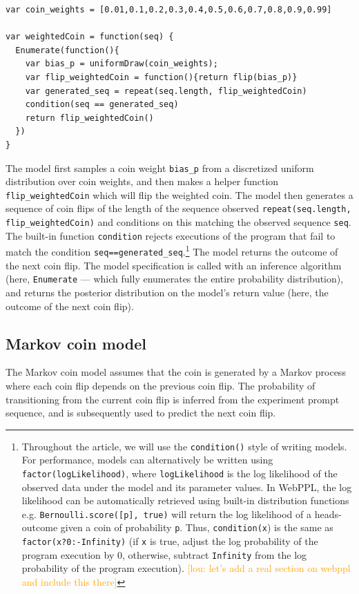 \documentclass{article}
\newcommand{\lou}[1]{\textcolor{orange}{[lou: #1]}}
\begin{document}
\begin{lstlisting}[caption=Biased coin model,  label={lst:m_weighted}]
var coin_weights = [0.01,0.1,0.2,0.3,0.4,0.5,0.6,0.7,0.8,0.9,0.99]

var weightedCoin = function(seq) {
  Enumerate(function(){
    var bias_p = uniformDraw(coin_weights);
    var flip_weightedCoin = function(){return flip(bias_p)}
    var generated_seq = repeat(seq.length, flip_weightedCoin)
    condition(seq == generated_seq)
    return flip_weightedCoin()
  })
}
\end{lstlisting}

%
The model first samples a coin weight \lstinline{bias_p} from a discretized uniform distribution over coin weights, and
then makes a helper function \lstinline{flip_weightedCoin} which will flip the weighted coin.
The model then generates a sequence of coin flips of the length of the sequence observed \lstinline{repeat(seq.length, flip_weightedCoin)} and conditions on this matching the observed sequence \lstinline{seq}.
The built-in function \lstinline{condition} rejects executions of the program that fail to match the condition \lstinline{seq==generated_seq}.\footnote{
Throughout the article, we will use the \lstinline{condition()} style of writing models. For performance, models can alternatively be written using \lstinline{factor(logLikelihood)}, where \lstinline{logLikelihood} is the log likelihood of the observed data under the model and its parameter values. In WebPPL, the log likelihood can be automatically retrieved using built-in distribution functions e.g. \lstinline{Bernoulli.score([p], true)} will return the log likelihood of a heads-outcome given a coin of probability \lstinline{p}.
Thus, \lstinline{condition(x}) is the same as \lstinline{factor(x?0:-Infinity)} (if \lstinline{x} is true, adjust the log probability of the program execution by 0, otherwise, subtract \lstinline{Infinity} from the log probability of the program execution). \lou{let's add a real section on webppl and include this there}
}
The model returns the outcome of the next coin flip.
The model specification is called with an inference algorithm (here, \lstinline{Enumerate} --- which fully enumerates the entire probability distribution), and returns the posterior distribution on the model's return value (here, the outcome of the next coin flip).

\subsection{Markov coin model}
\label{s:tutorial:sss:markov}
The Markov coin model assumes that the coin is generated by a Markov process where each coin flip depends on the previous coin flip. The probability of transitioning from the current coin flip is inferred from the experiment prompt sequence, and is subsequently used to predict the next coin flip.
%
\end{document}

